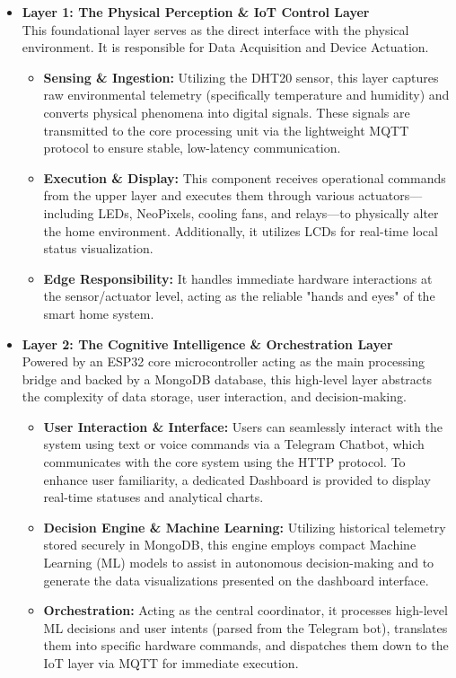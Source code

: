 \begin{itemize}
  \item \textbf{Layer 1: The Physical Perception \& IoT Control Layer} \\
    This foundational layer serves as the direct interface with the physical environment. It is responsible for Data Acquisition and Device Actuation.
    \begin{itemize}
      \item \textbf{Sensing \& Ingestion:} Utilizing the DHT20 sensor, this layer captures raw environmental telemetry (specifically temperature and humidity) and converts physical phenomena into digital signals. These signals are transmitted to the core processing unit via the lightweight MQTT protocol to ensure stable, low-latency communication.
      \item \textbf{Execution \& Display:} This component receives operational commands from the upper layer and executes them through various actuators—including LEDs, NeoPixels, cooling fans, and relays—to physically alter the home environment. Additionally, it utilizes LCDs for real-time local status visualization.
      \item \textbf{Edge Responsibility:} It handles immediate hardware interactions at the sensor/actuator level, acting as the reliable "hands and eyes" of the smart home system.
    \end{itemize}

  \item \textbf{Layer 2: The Cognitive Intelligence \& Orchestration Layer} \\
    Powered by an ESP32 core microcontroller acting as the main processing bridge and backed by a MongoDB database, this high-level layer abstracts the complexity of data storage, user interaction, and decision-making.
    \begin{itemize}
      \item \textbf{User Interaction \& Interface:} Users can seamlessly interact with the system using text or voice commands via a Telegram Chatbot, which communicates with the core system using the HTTP protocol. To enhance user familiarity, a dedicated Dashboard is provided to display real-time statuses and analytical charts.
      \item \textbf{Decision Engine \& Machine Learning:} Utilizing historical telemetry stored securely in MongoDB, this engine employs compact Machine Learning (ML) models to assist in autonomous decision-making and to generate the data visualizations presented on the dashboard interface.
      \item \textbf{Orchestration:} Acting as the central coordinator, it processes high-level ML decisions and user intents (parsed from the Telegram bot), translates them into specific hardware commands, and dispatches them down to the IoT layer via MQTT for immediate execution.
    \end{itemize}
\end{itemize}

